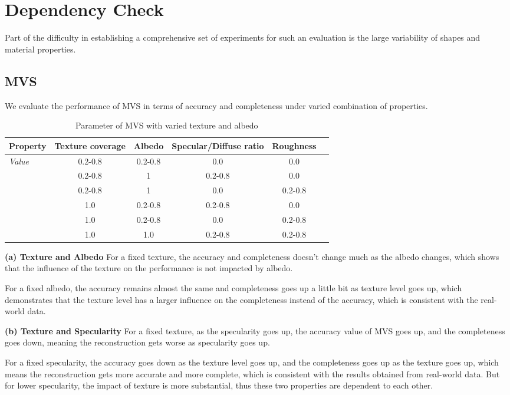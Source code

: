 \section{Dependency Check}
Part of the difficulty in establishing a comprehensive set of experiments for such an evaluation is the large variability of shapes and material properties.

\subsection{MVS}
We evaluate the performance of MVS in terms of accuracy and completeness under varied combination of properties.
\begin{table}[h]
  \centering
  \begin{tabular}{l*{5}{c}}
  \hline
  \textbf{Property} & Texture coverage & Albedo & Specular/Diffuse ratio & Roughness\\
  \hline
  \textit{Value} & 0.2-0.8 & 0.2-0.8 & 0.0 & 0.0\\
                 & 0.2-0.8 & 1 & 0.2-0.8 & 0.0\\
                 & 0.2-0.8 & 1 & 0.0 & 0.2-0.8\\
                 & 1.0 & 0.2-0.8 & 0.2-0.8 & 0.0\\
                 & 1.0 & 0.2-0.8 & 0.0 & 0.2-0.8\\
                 & 1.0 & 1.0 & 0.2-0.8 & 0.2-0.8\\
  \hline
  \end{tabular}
  \caption{Parameter of MVS with varied texture and albedo}
\end{table}

\textbf{(a) Texture and Albedo} 
For a fixed texture, the accuracy and completeness doesn't change much as the albedo changes, which shows that the influence of the texture on the performance is not impacted by albedo.

For a fixed albedo, the accuracy remains almost the same and completeness goes up a little bit as texture level goes up, which demonstrates that the texture level has a larger influence on the completeness instead of the accuracy, which is consistent with the real-world data.

\textbf{(b) Texture and Specularity} 
For a fixed texture, as the specularity goes up, the accuracy value of MVS goes up, and the completeness goes down, meaning the reconstruction gets worse as specularity goes up.

For a fixed specularity, the accuracy goes down as the texture level goes up, and the completeness goes up as the texture goes up, which means the reconstruction gets more accurate and more complete, which is consistent with the results obtained from real-world data. But for lower specularity, the impact of texture is more substantial, thus these two properties are dependent to each other.

